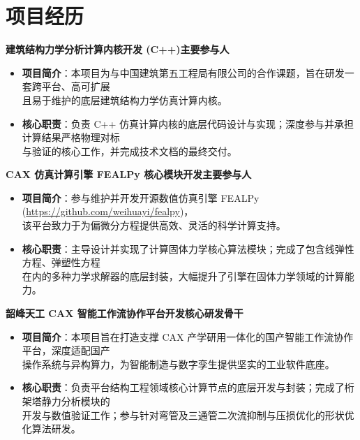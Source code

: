 \documentclass[11pt]{article}
\newlength{\iconwidth}
\begin{document}
	\begin{minipage}[t]{\textwidth}
		\section[项目经历]{\makebox[\iconwidth][c]{\color{primary_color}{\faChalkboardTeacher}}\quad 项目经历}
		
		\vspace{0.5em}
		
		{\large \textbf{建筑结构力学分析计算内核开发 (C++)}}\quad \textbf{主要参与人}
		\begin{itemize}
			\setlength{\itemsep}{0.2em}
			\item \textbf{项目简介}：本项目为与中国建筑第五工程局有限公司的合作课题，旨在研发一套跨平台、高可扩展\\
			且易于维护的底层建筑结构力学仿真计算内核。
			\item \textbf{核心职责}：负责 C++ 仿真计算内核的底层代码设计与实现；深度参与并承担计算结果严格物理对标\\
			与验证的核心工作，并完成技术文档的最终交付。
		\end{itemize}
		
		\vspace{0.6em}
		
		{\large \textbf{CAX 仿真计算引擎 FEALPy 核心模块开发}}\quad \textbf{主要参与人}
		\begin{itemize}
			\setlength{\itemsep}{0.2em}
			\item \textbf{项目简介}：参与维护并开发开源数值仿真引擎 FEALPy (\href{https://github.com/weihuayi/fealpy}{https://github.com/weihuayi/fealpy})，\\
			该平台致力于为偏微分方程提供高效、灵活的科学计算支持。
			\item \textbf{核心职责}：主导设计并实现了计算固体力学核心算法模块；完成了包含线弹性方程、弹塑性方程\\
			在内的多种力学求解器的底层封装，大幅提升了引擎在固体力学领域的计算能力。
		\end{itemize}
		
		\vspace{0.6em}
		
		{\large \textbf{韶峰天工 CAX 智能工作流协作平台开发}}\quad \textbf{核心研发骨干}
		\begin{itemize}
			\setlength{\itemsep}{0.2em}
			\item \textbf{项目简介}：本项目旨在打造支撑 CAX 产学研用一体化的国产智能工作流协作平台，深度适配国产\\
			操作系统与异构算力，为智能制造与数字孪生提供坚实的工业软件底座。
			\item \textbf{核心职责}：负责平台结构工程领域核心计算节点的底层开发与封装；完成了桁架塔静力分析模块的\\
			开发与数值验证工作；参与针对弯管及三通管二次流抑制与压损优化的形状优化算法研发。
		\end{itemize}
		
		\vspace{1.2em}
	\end{minipage}
	
\end{document}
